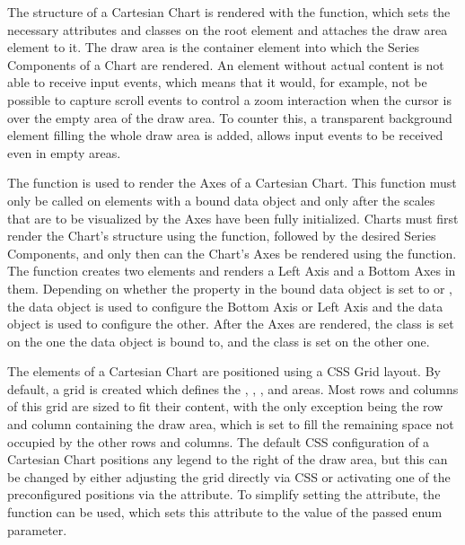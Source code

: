 The structure of a Cartesian Chart is rendered with the
 function, which sets the necessary
attributes and classes on the root element and attaches the draw area
 element to it. The draw area is the container element
into which the Series Components of a Chart are rendered. An
 element without actual content is not able to receive
input events, which means that it would, for example, not be possible
to capture scroll events to control a zoom interaction when the cursor
is over the empty area of the draw area. To counter this, a
transparent  background element filling the whole draw
area is added, allows input events to be received even in empty areas.

The  function is used to render the
Axes of a Cartesian Chart. This function must only be called on
elements with a bound  data object and only after
the scales that are to be visualized by the Axes have been fully
initialized. Charts must first render the Chart's structure using the
 function, followed by the desired Series
Components, and only then can the Chart's Axes be rendered using the
 function. The
 function creates two 
elements and renders a Left Axis and a Bottom Axes in them. Depending
on whether the  property in the bound data object is set
to  or , the  data object is used
to configure the Bottom Axis or Left Axis and the  data
object is used to configure the other. After the Axes are rendered,
the  class is set on the one the  data
object is bound to, and the  class is set on the other
one.

The elements of a Cartesian Chart are positioned using a CSS Grid
layout. By default, a grid is created which defines the
, , , and
 areas. Most rows and columns of this grid are sized to
fit their content, with the only exception being the row and column
containing the draw area, which is set to fill the remaining space not
occupied by the other rows and columns. The default CSS configuration
of a Cartesian Chart positions any legend to the right of the draw
area, but this can be changed by either adjusting the grid directly
via CSS or activating one of the preconfigured positions via the
 attribute. To simplify setting the
 attribute, the 
function can be used, which sets this attribute to the value of the
passed  enum parameter.






